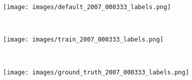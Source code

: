 \documentclass[10pt,twocolumn,letterpaper]{article}
\begin{document}
\begin{figure*}[t!]
    \centering
    \begin{subfigure}[t]{0.3\textwidth}
        \centering
        \texttt{[image: images/default\_2007\_000333\_labels.png]}
    \end{subfigure}
    ~
    \begin{subfigure}[t]{0.3\textwidth}
        \centering
        \texttt{[image: images/train\_2007\_000333\_labels.png]}
    \end{subfigure}
    ~
    \begin{subfigure}[t]{0.3\textwidth}
        \centering
        \texttt{[image: images/ground\_truth\_2007\_000333\_labels.png]}
    \end{subfigure} \\


\end{figure*}
\end{document}
